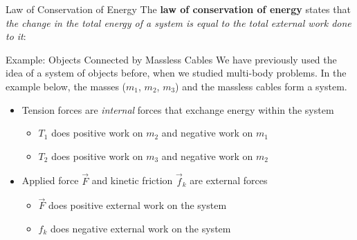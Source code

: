 \documentclass[12pt,compress,aspectratio=169]{beamer}
\begin{document}
\begin{frame}{Law of Conservation of Energy}
  The \textbf{law of conservation of energy} states that \emph{the change in
  the total energy of a {\color{violet}system} is equal to the total external
  work done to it}:


\end{frame}



\begin{frame}{Example: Objects Connected by Massless Cables}
  We have previously used the idea of a {\color{violet}system of objects}
  before, when we studied multi-body problems. In the example below, the
  masses ($m_1$, $m_2$, $m_3$) and the massless cables form a system.
  \begin{center}
  \end{center}
  \begin{itemize}
  \item Tension forces are \emph{internal} forces that exchange energy within
    the system
    \begin{itemize}
    \item $T_1$ does positive work on $m_2$ and negative work on $m_1$
    \item $T_2$ does positive work on $m_3$ and negative work on $m_2$
    \end{itemize}
  \item Applied force $\vec F$ and kinetic friction $\vec f_k$ are external
    forces
    \begin{itemize}
    \item $\vec F$ does positive external work on the system
    \item $f_k$ does negative external work on the system
    \end{itemize}
  \end{itemize}
\end{frame}
\end{document}
